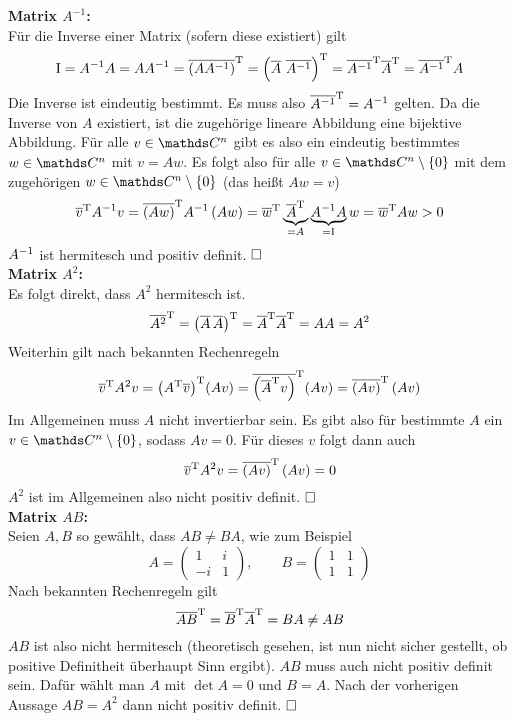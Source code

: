 		\textbf{Matrix $A^{-1}$:}\\
		Für die Inverse einer Matrix (sofern diese existiert) gilt
		\[ \idmat = \inv{A}A = A\inv{A} = \transp{\conj{\curvb{ A\inv{A} }}} = \transp{\curvb{\conj{A}\ \conj{\inv{A}}}} = \transp{\conj{\inv{A}}} \transp{\conj{A}} = \transp{\conj{\inv{A}}} A \]
		Die Inverse ist eindeutig bestimmt.
		Es muss also ${\overline{{A}^{-1}}}^{\mathrm{T}} = {A}^{-1}$ gelten.
		Da die Inverse von $A$ existiert, ist die zugehörige lineare Abbildung eine bijektive Abbildung.
		Für alle $v\in\SC^n$ gibt es also ein eindeutig bestimmtes $w\in\SC^n$ mit $v=Aw$.
		Es folgt also für alle $v\in\SC^n\setminus\curlb{0}$ mit dem zugehörigen $w\in\SC^n\setminus\curlb{0}$ (das heißt $Aw = v$)
		\[ {\overline{v}}^{\mathrm{T}}{A}^{-1}v = {\overline{\left( Aw \right)}}^{\mathrm{T}}{A}^{-1}\left( Aw \right) = {\overline{w}}^{\mathrm{T}} \underbrace{{\overline{A}}^{\mathrm{T}}}_{=A} \underbrace{{A}^{-1}A}_{=\mathrm{I}} w = {\overline{w}}^{\mathrm{T}}Aw > 0 \]
		${A}^{-1}$ ist hermitesch und positiv definit. $\hfill \Box$\\

		\textbf{Matrix $A^2$:}\\
		Es folgt direkt, dass $A^2$ hermitesch ist.
		\[ {\overline{A^2}}^{\mathrm{T}} = {\left( \overline{A}\,\overline{A} \right)}^{\mathrm{T}} = {\overline{A}}^{\mathrm{T}}{\overline{A}}^{\mathrm{T}} = AA = A^2 \]
		Weiterhin gilt nach bekannten Rechenregeln
		\[ {\overline{v}}^{\mathrm{T}}A^2 v = {\left(  {A}^{\mathrm{T}}\overline{v}  \right)}^{\mathrm{T}}(Av) = {\overline{\left( {\overline{A}}^{\mathrm{T}}v \right)}}^{\mathrm{T}}(Av) = {\overline{\left( Av \right)}}^{\mathrm{T}}\left( Av \right) \]
		Im Allgemeinen muss $A$ nicht invertierbar sein.
		Es gibt also für bestimmte $A$ ein $v\in\SC^n\setminus\curlb{0}$, sodass $Av=0$.
		Für dieses $v$ folgt dann auch
		\[ {\overline{v}}^{\mathrm{T}}A^2 v = {\overline{\left( Av \right)}}^{\mathrm{T}}\left( Av \right) = 0 \]
		$A^2$ ist im Allgemeinen also nicht positiv definit. $\hfill \Box$\\

		\textbf{Matrix $AB$:}\\
		Seien $A,B$ so gewählt, dass $AB\neq BA$, wie zum Beispiel
		\[
			A=
			\begin{pmatrix}
				1 & i \\ -i & 1
			\end{pmatrix}
			,\qquad 
			B = 
			\begin{pmatrix}
				1 & 1 \\ 1& 1
			\end{pmatrix}
		\]
		Nach bekannten Rechenregeln gilt
		\[ {\overline{AB}}^{\mathrm{T}} = {\overline{B}}^{\mathrm{T}}{\overline{A}}^{\mathrm{T}} = BA \neq AB \]
		$AB$ ist also nicht hermitesch (theoretisch gesehen, ist nun nicht sicher gestellt, ob positive Definitheit überhaupt Sinn ergibt).
		$AB$ muss auch nicht positiv definit sein.
		Dafür wählt man $A$ mit $\det A = 0$ und $B=A$.
		Nach der vorherigen Aussage $AB=A^2$ dann nicht positiv definit. $\hfill \Box$\\

